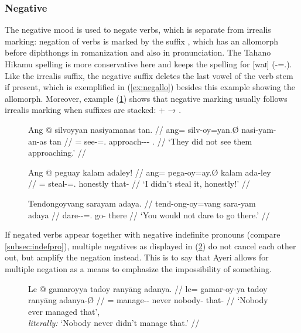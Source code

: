 
\subsubsection{Negative}
\label{subsubsec:verbneg}

The negative mood is used to negate verbs, which is separate from irrealis
marking: negation of verbs is marked by the suffix , which has
an allomorph  before diphthongs in romanization and also in
pronunciation. The Tahano Hikamu spelling is more conservative here and keeps
the spelling   for [waɪ]
(\mbox{-\Neg{}=\Fsg{}.\Top{}}). Like the irrealis suffix, the
negative suffix deletes the last vowel of the verb stem if present, which is
exemplified in (\ref{ex:negallo}) besides this example showing the 
allomorph. Moreover, example (\ref{ex:irrneg}) shows that negative marking
usually follows irrealis marking when suffixes are stacked:  +
 → .

\begin{figure}[h]
\pex
\a\label{ex:negative}\begingl
	\gla Ang @ silvoyyan nasiyamanas tan. //
	\glb ang= silv-oy=yan.Ø nasi-yam-an-as tan //
	\glc \AgtT{}= see-\Neg{}=\TplM{}.\Top{} approach-\Ptcp{}-\Nmlz{}-\Parg{} 
		\TplM{}.\Gen{} //
	\glft `They did not see them approaching.' //
\endgl

\a\label{ex:negallo}\begingl
	\gla Ang @ peguay kalam adaley! //
	\glb ang= pega-oy=ay.Ø kalam ada-ley //
	\glc \AgtT{}= steal-\Neg{}=\Fsg{}.\Top{} honestly that-\PargI{} //
	\glft `I didn't steal it, honestly!' //
\endgl

\a\label{ex:irrneg}\begingl
	\gla Tendongoyvang sarayam adaya. //
	\glb tend-ong-oy=vang sara-yam adaya //
	\glc dare-\Irr{}-\Neg{}=\Second{}.\Aarg{} go-\Ptcp{} there //
	\glft `You would not dare to go there.' //
\endgl
\xe
\end{figure}

If negated verbs appear together with negative indefinite pronouns (compare 
\autoref{subsec:indefpro}), multiple negatives as displayed in
(\ref{ex:dblneg}) do not cancel each other out, but amplify the negation
instead. This is to say that Ayeri allows for multiple
negation as a means to emphasize the
impossibility of something.

\begin{figure}[h]
\ex\label{ex:dblneg}
\begingl
	\gla Le @ gamaroyya tadoy ranyāng adanya. //
	\glb le= gamar-oy-ya tadoy ranyāng adanya-Ø //
	\glc \PatTI{}= manage-\Neg{}-\TsgM{} never nobody-\Aarg{} that-\Top{} //
	\glft `Nobody ever managed that',\\
		\textit{literally:} `Nobody never didn't manage that.' //
\endgl
\xe
\end{figure}

